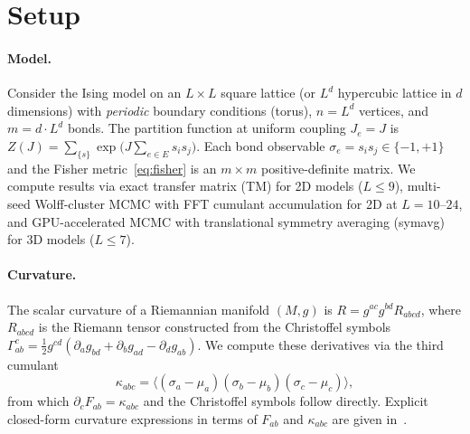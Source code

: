 \documentclass[aps,prl,twocolumn,superscriptaddress,showpacs]{revtex4-2}
\newcommand{\Scal}{R}
\begin{document}
\section{Setup}

\paragraph{Model.}
Consider the Ising model on an $L \times L$ square lattice (or $L^d$
hypercubic lattice in $d$ dimensions) with \emph{periodic} boundary
conditions (torus), $n = L^d$ vertices, and $m = d \cdot L^d$ bonds.
The partition function at uniform coupling $J_e = J$ is
$Z(J) = \sum_{\{s\}} \exp\bigl(J \sum_{e \in E} s_i s_j\bigr)$.
Each bond observable $\sigma_e = s_i s_j \in \{-1, +1\}$ and the
Fisher metric~\eqref{eq:fisher} is an $m \times m$ positive-definite
matrix. We compute results via exact transfer matrix (TM) for 2D models
($L \leq 9$), multi-seed Wolff-cluster MCMC with FFT cumulant
accumulation for 2D at $L = 10$--$24$, and GPU-accelerated MCMC
with translational symmetry averaging (symavg) for 3D models ($L \leq 7$).

\paragraph{Curvature.}
The scalar curvature of a Riemannian manifold $(M, g)$ is
$\Scal = g^{ac} g^{bd} R_{abcd}$, where $R_{abcd}$ is the Riemann
tensor constructed from the Christoffel symbols
$\Gamma^c_{ab} = \frac{1}{2} g^{cd}(\partial_a g_{bd} + \partial_b g_{ad}
  - \partial_d g_{ab})$.
We compute these derivatives via the third cumulant
\begin{equation}
  \kappa_{abc} = \langle (\sigma_a - \mu_a)(\sigma_b - \mu_b)
    (\sigma_c - \mu_c) \rangle,
  \label{eq:kappa3}
\end{equation}
from which $\partial_c F_{ab} = \kappa_{abc}$ and the Christoffel symbols
follow directly. Explicit closed-form curvature expressions in terms of
$F_{ab}$ and $\kappa_{abc}$ are given in~\cite{Paper7}.
\end{document}
